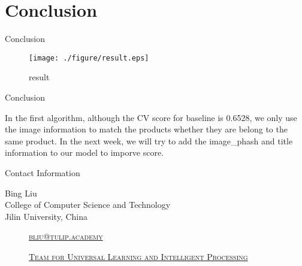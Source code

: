 \documentclass[
 size=14pt,
 paper=smartboard,  %
 mode=present, 		%
 display=slides, 	%
 style=tuliplab,  	%
 pauseslide,
 fleqn,leqno]{powerdot}
\begin{document}
\section{Conclusion}
\begin{slide}[toc=,bm=]{Conclusion}
	\begin{center}
		\begin{figure}[htbp]
			\texttt{[image: ./figure/result.eps]}
			\caption{result}
		\end{figure}
	\end{center}
\end{slide}

\begin{slide}[toc=,bm=]{Conclusion}

In the first algorithm, although the CV score for baseline is 0.6528, we only use the image information to match the products whether they are belong to the same product. 
\bigskip
In the next week, we will try to add the image\_phash and title information to our model to imporve score.

\end{slide}


\begin{wideslide}[toc=,bm=]{Contact Information}
\centering
{}
\twocolumn[
lcolwidth=0.35\linewidth,
rcolwidth=0.65\linewidth
]
{
}
{
Bing Liu\\
College of Computer Science and Technology\\
Jilin University, China
\begin{description}
 \item[\textcolor{orange}{\faEnvelope}] \href{mailto:bliu@tulip.academy}
 {\textsc{\footnotesize{bliu@tulip.academy}}}

 \item[\textcolor{orange}{\faHome}] \href{http://www.tulip.org.au}
 {\textsc{\footnotesize{Team for Universal Learning and Intelligent Processing}}}
\end{description}
}
\end{wideslide}
\end{document}
